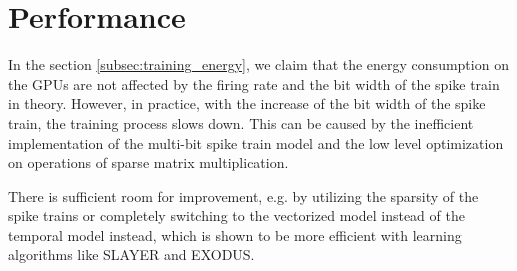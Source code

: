 \section{Performance}
\label{sec:performance}
    In the section \ref{subsec:training_energy}, we claim that the energy consumption on the GPUs are not affected by the firing rate and the bit width of the spike train in theory. However, in practice, with the increase of the bit width of the spike train, the training process slows down. This can be caused by the inefficient implementation of the multi-bit spike train model and the low level optimization on operations of sparse matrix multiplication. 

    There is sufficient room for improvement, e.g. by utilizing the sparsity of the spike trains or completely switching to the vectorized model instead of the temporal model instead, which is shown to be more efficient with learning algorithms like SLAYER and EXODUS. 
